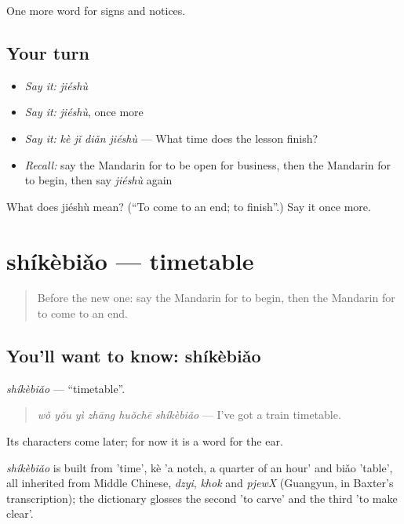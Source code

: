 \begin{grammarlens}[title={What you've built}]
One more word for signs and notices.
\end{grammarlens}

\subsection*{Your turn}
\begin{itemize}
\raggedright
  \item \emph{Say it:} \emph{jiéshù}
  \item \emph{Say it:} \emph{jiéshù}, once more
  \item \emph{Say it:} \emph{kè jǐ diǎn jiéshù} — What time does the lesson finish?
  \item \emph{Recall:} say the Mandarin for to be open for business, then the Mandarin for to begin, then say \emph{jiéshù} again
\end{itemize}

\begin{tcolorbox}[breakable,colback=teal!4,colframe=teal!35!black,title={Before you move on}]
What does jiéshù mean? (\textquotedblleft{}To come to an end; to finish\textquotedblright{}.) Say it once more.
\end{tcolorbox}
\section[shíkèbiǎo]{shíkèbiǎo — timetable}

\label{lesson:ZH-C122-shikebiao}



\begin{quote}
Before the new one: say the Mandarin for to begin, then the Mandarin for to come to an end.
\end{quote}

\subsection*{You'll want to know: shíkèbiǎo}
\emph{shíkèbiǎo} — \textquotedblleft{}timetable\textquotedblright{}.

\begin{quote}
\emph{wǒ yǒu yì zhāng huǒchē shíkèbiǎo} — I've got a train timetable.
\end{quote}

Its characters come later; for now it is a word for the ear.

\begin{cousinweb}
\emph{shíkèbiǎo} is built from  'time', kè 'a notch, a quarter of an hour' and biǎo 'table', all inherited from Middle Chinese, \emph{dzyi}, \emph{khok} and \emph{pjewX} (Guangyun, in Baxter's transcription); the dictionary glosses the second 'to carve' and the third 'to make clear'.
\end{cousinweb}

